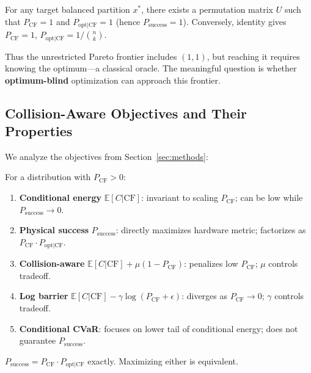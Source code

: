 \begin{proposition}
\label{prop:permutation_extremes}
For any target balanced partition $x^*$, there exists a permutation matrix $U$ such that $P_{\mathrm{CF}}=1$ and $P_{\mathrm{opt|CF}}=1$ (hence $P_{\mathrm{success}}=1$). Conversely, identity gives $P_{\mathrm{CF}}=1$, $P_{\mathrm{opt|CF}}=1/\binom{n}{k}$.
\end{proposition}

Thus the unrestricted Pareto frontier includes $(1,1)$, but reaching it requires knowing the optimum---a classical oracle. The meaningful question is whether \textbf{optimum-blind} optimization can approach this frontier.

\subsection{Collision-Aware Objectives and Their Properties}

We analyze the objectives from Section~\ref{sec:methods}:

\begin{proposition}
\label{prop:objective_properties}
For a distribution with $P_{\mathrm{CF}} > 0$:
\begin{enumerate}
\item \textbf{Conditional energy} $\mathbb{E}[C|\mathrm{CF}]$: invariant to scaling $P_{\mathrm{CF}}$; can be low while $P_{\mathrm{success}}\to 0$.
\item \textbf{Physical success} $P_{\mathrm{success}}$: directly maximizes hardware metric; factorizes as $P_{\mathrm{CF}} \cdot P_{\mathrm{opt|CF}}$.
\item \textbf{Collision-aware} $\mathbb{E}[C|\mathrm{CF}] + \mu(1-P_{\mathrm{CF}})$: penalizes low $P_{\mathrm{CF}}$; $\mu$ controls tradeoff.
\item \textbf{Log barrier} $\mathbb{E}[C|\mathrm{CF}] - \gamma \log(P_{\mathrm{CF}}+\epsilon)$: diverges as $P_{\mathrm{CF}}\to 0$; $\gamma$ controls tradeoff.
\item \textbf{Conditional CVaR}: focuses on lower tail of conditional energy; does not guarantee $P_{\mathrm{success}}$.
\end{enumerate}
\end{proposition}

\begin{proposition}
\label{prop:success_factorized}
$P_{\mathrm{success}} = P_{\mathrm{CF}} \cdot P_{\mathrm{opt|CF}}$ exactly. Maximizing either is equivalent.
\end{proposition}

